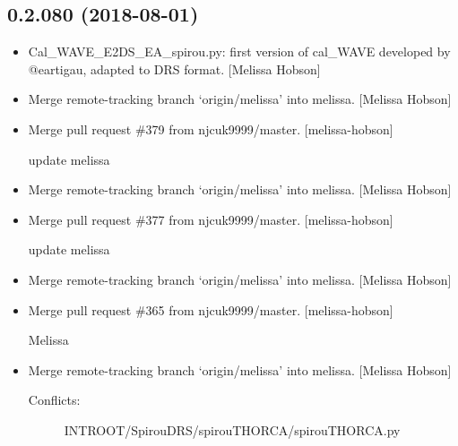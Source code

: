 \documentclass[a4paper,10pt,english]{report}
\begin{document}
\subsection{0.2.080 (2018-08-01)}
\label{\detokenize{misc/changelog:id381}}\begin{itemize}
\item {} 
Cal\_WAVE\_E2DS\_EA\_spirou.py: first version of cal\_WAVE developed by
@eartigau, adapted to DRS format. {[}Melissa Hobson{]}

\item {} 
Merge remote-tracking branch ‘origin/melissa’ into melissa. {[}Melissa
Hobson{]}

\item {} 
Merge pull request \#379 from njcuk9999/master. {[}melissa-hobson{]}

update melissa

\item {} 
Merge remote-tracking branch ‘origin/melissa’ into melissa. {[}Melissa
Hobson{]}

\item {} 
Merge pull request \#377 from njcuk9999/master. {[}melissa-hobson{]}

update melissa

\item {} 
Merge remote-tracking branch ‘origin/melissa’ into melissa. {[}Melissa
Hobson{]}

\item {} 
Merge pull request \#365 from njcuk9999/master. {[}melissa-hobson{]}

Melissa

\item {} 
Merge remote-tracking branch ‘origin/melissa’ into melissa. {[}Melissa
Hobson{]}
\begin{description}
\item[{Conflicts:}] \leavevmode
INTROOT/SpirouDRS/spirouTHORCA/spirouTHORCA.py

\end{description}

\end{itemize}
\end{document}
